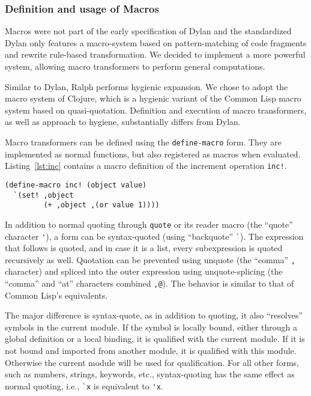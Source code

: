 \documentclass{acm_proc_article-sp}
\begin{document}
\subsubsection{Definition and usage of Macros}


Macros were not part of the early specification of Dylan and the
standardized Dylan only features a macro-system based on
pattern-matching of code fragments and rewrite rule-based
transformation. We decided to implement a more powerful system,
allowing macro transformers to perform general computations.
\pagebreak

Similar to Dylan, Ralph performs hygienic expansion. We chose to adopt
the macro system of Clojure, which is a hygienic variant of the Common
Lisp macro system based on quasi-quotation. Definition and execution
of macro transformers, as well as approach to hygiene, substantially
differs from Dylan.


Macro transformers can be defined using the \texttt{define-macro}
form. They are implemented as normal functions, but also registered as
macros when evaluated. Listing~\ref{lst:inc} contains a macro
definition of the increment operation \texttt{inc!}.

\begin{lstlisting}[caption=Macro definition of \texttt{inc!},label=lst:inc]
(define-macro inc! (object value)
  `(set! ,object
         (+ ,object ,(or value 1))))
\end{lstlisting}

In addition to normal quoting through \texttt{quote} or its reader
macro (the ``quote'' character \lstinline{'}), a form can be
syntax-quoted (using ``backquote'' \lstinline{`}). The expression that
follows is quoted, and in case it is a list, every subexpression is
quoted recursively as well. Quotation can be prevented using unquote
(the ``comma'' \lstinline{,} character) and spliced into the outer
expression using unquote-splicing (the ``comma'' and ``at'' characters
combined \lstinline{,@}). The behavior is similar to that of Common
Lisp's equivalents.

The major difference is syntax-quote, as in addition to quoting, it
also ``resolves'' symbols in the current module. If the symbol is
locally bound, either through a global definition or a local binding,
it is qualified with the current module. If it is not bound and
imported from another module, it is qualified with this
module. Otherwise the current module  will be used for
qualification. For all other forms, such as numbers, strings,
keywords, etc., syntax-quoting has the same effect as normal quoting,
i.e., \lstinline{`x} is equivalent to \lstinline{'x}.
\end{document}
